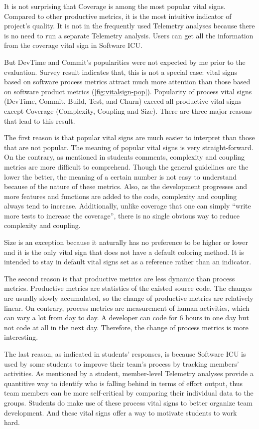 It is not surprising that Coverage is among the most popular vital signs. Compared to other productive metrics, it is the most intuitive indicator of project's quality. It is not in the frequently used Telemetry analyses because there is no need to run a separate Telemetry analysis. Users can get all the information from the coverage vital sign in Software ICU.

But DevTime and Commit's popularities were not expected by me prior to the evaluation. Survey result indicates that, this is not a special case: vital signs based on software process metrics attract much more attention than those based on software product metrics (\autoref{fig:vitalsign-pop}). Popularity of process vital signs (DevTime, Commit, Build, Test, and Churn) exceed all productive vital signs except Coverage (Complexity, Coupling and Size). There are three major reasons that lead to this result. 

The first reason is that popular vital signs are much easier to interpret than those that are not popular. The meaning of popular vital signs is very straight-forward. On the contrary, as mentioned in students comments, complexity and coupling metrics are more difficult to comprehend. Though the general guidelines are the lower the better, the meaning of a certain number is not easy to understand because of the nature of these metrics. Also, as the development progresses and more features and functions are added to the code, complexity and coupling always tend to increase. Additionally, unlike coverage that one can simply ``write more tests to increase the coverage'', there is no single obvious way to reduce complexity and coupling. 

Size is an exception because it naturally has no preference to be higher or lower and it is the only vital sign that does not have a default coloring method. It is intended to stay in default vital signs set as a reference rather than an indicator.

The second reason is that productive metrics are less dynamic than process metrics. Productive metrics are statistics of the existed source code. The changes are usually slowly accumulated, so the change of productive metrics are relatively linear. On contrary, process metrics are measurement of human activities, which can vary a lot from day to day. A developer can code for 6 hours in one day but not code at all in the next day. Therefore, the change of process metrics is more interesting.

The last reason, as indicated in students' responses, is because Software ICU is used by some students to improve their team's process by tracking members' activities. As mentioned by a student, member-level Telemetry analyses provide a quantitive way to identify who is falling behind in terms of effort output, thus team members can be more self-critical by comparing their individual data to the groups. Students do make use of these process vital signs to better organize team development. And these vital signs offer a way to motivate students to work hard.

